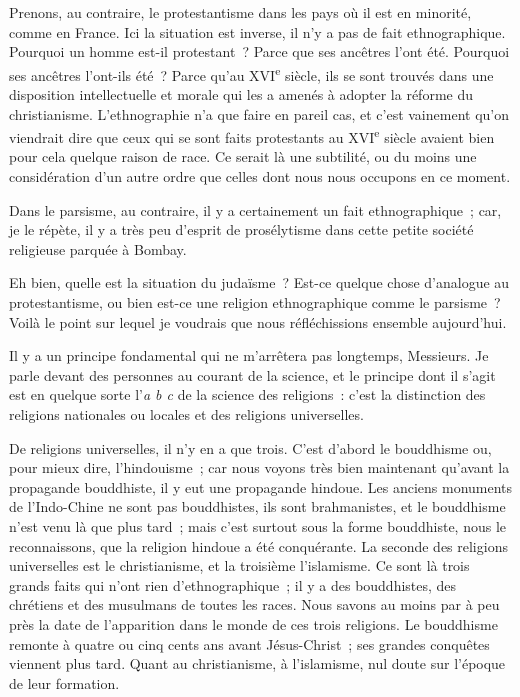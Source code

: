 \documentclass[french,twoside]{book} %
\newcommand\orgName[1]{#1}
\newcommand\placeName[1]{#1}
\begin{document}
Prenons, au contraire, le protestantisme dans les pays où il est en minorité, comme en {\placeName France}. Ici la situation est inverse, il n’y a pas de fait ethnographique. Pourquoi un homme est-il protestant ? Parce que ses ancêtres l’ont été. Pourquoi ses ancêtres l’ont-ils été ? Parce qu’au XVI\textsuperscript{e} siècle, ils se sont trouvés dans une disposition intellectuelle et morale qui les a amenés à adopter la réforme du christianisme. L’ethnographie n’a que faire en pareil cas, et c’est vainement qu’on viendrait dire que ceux qui se sont faits protestants au XVI\textsuperscript{e} siècle avaient bien pour cela quelque raison de race. Ce serait là une subtilité, ou du moins une considération d’un autre ordre que celles dont nous nous occupons en ce moment.\par
Dans le parsisme, au contraire, il y a certainement un fait ethnographique ; car, je le répète, il y a très peu d’esprit de prosélytisme dans cette petite société religieuse parquée à {\placeName Bombay}.\par
Eh bien, quelle est la situation du {\orgName judaïsme} ? Est-ce quelque chose d’analogue au {\orgName protestantisme}, ou bien est-ce une religion ethnographique comme le {\orgName parsisme} ? Voilà le point sur lequel je voudrais que nous réfléchissions ensemble aujourd’hui.\par
Il y a un principe fondamental qui ne m’arrêtera pas longtemps, Messieurs. Je parle devant des personnes au courant de la science, et le principe dont il s’agit est en quelque sorte l’{\itshape a b c} de la science des religions : c’est la distinction des religions nationales ou locales et des religions universelles.\par
De religions universelles, il n’y en a que trois. C’est d’abord le {\orgName bouddhisme} ou, pour mieux dire, l’{\orgName hindouisme} ; car nous voyons très bien maintenant qu’avant la propagande bouddhiste, il y eut une propagande hindoue. Les anciens monuments de l’{\placeName Indo-Chine} ne sont pas {\orgName bouddhistes}, ils sont {\orgName brahmanistes}, et le {\orgName bouddhisme} n’est venu là que plus tard ; mais c’est surtout sous la forme bouddhiste, nous le reconnaissons, que la religion hindoue a été conquérante. La seconde des religions universelles est le {\orgName christianisme}, et la troisième l’{\orgName islamisme}. Ce sont là trois grands faits qui n’ont rien d’ethnographique ; il y a des {\orgName bouddhistes}, des {\orgName chrétiens} et des {\orgName musulmans} de toutes les races. Nous savons au moins par à peu près la date de l’apparition dans le monde de ces trois religions. Le {\orgName bouddhisme} remonte à quatre ou cinq cents ans avant Jésus-Christ ; ses grandes conquêtes viennent plus tard. Quant au {\orgName christianisme}, à l’{\orgName islamisme}, nul doute sur l’époque de leur formation.\par
\end{document}
